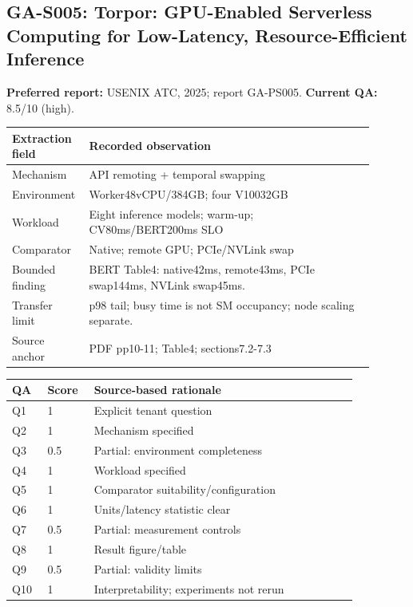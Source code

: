 \subsection{GA-S005: Torpor: GPU-Enabled Serverless Computing for Low-Latency, Resource-Efficient Inference}
\textbf{Preferred report:} USENIX ATC, 2025; report GA-PS005. \textbf{Current QA:} 8.5/10 (high).
\begin{longtable}{P{0.15\linewidth}P{0.75\linewidth}}
\toprule Extraction field & Recorded observation\\\midrule\endhead
Mechanism & API remoting + temporal swapping\\
Environment & Worker48vCPU/384GB; four V10032GB\\
Workload & Eight inference models; warm-up; CV80ms/BERT200ms SLO\\
Comparator & Native; remote GPU; PCIe/NVLink swap\\
Bounded finding & BERT Table4: native42ms, remote43ms, PCIe swap144ms, NVLink swap45ms.\\
Transfer limit & p98 tail; busy time is not SM occupancy; node scaling separate.\\
Source anchor & PDF pp10-11; Table4; sections7.2-7.3\\
\bottomrule\end{longtable}
\begin{longtable}{P{0.09\linewidth}P{0.10\linewidth}P{0.67\linewidth}}
\toprule QA & Score & Source-based rationale\\\midrule\endhead
Q1 & 1 & Explicit tenant question\\
Q2 & 1 & Mechanism specified\\
Q3 & 0.5 & Partial: environment completeness\\
Q4 & 1 & Workload specified\\
Q5 & 1 & Comparator suitability/configuration\\
Q6 & 1 & Units/latency statistic clear\\
Q7 & 0.5 & Partial: measurement controls\\
Q8 & 1 & Result figure/table\\
Q9 & 0.5 & Partial: validity limits\\
Q10 & 1 & Interpretability; experiments not rerun\\
\bottomrule\end{longtable}


